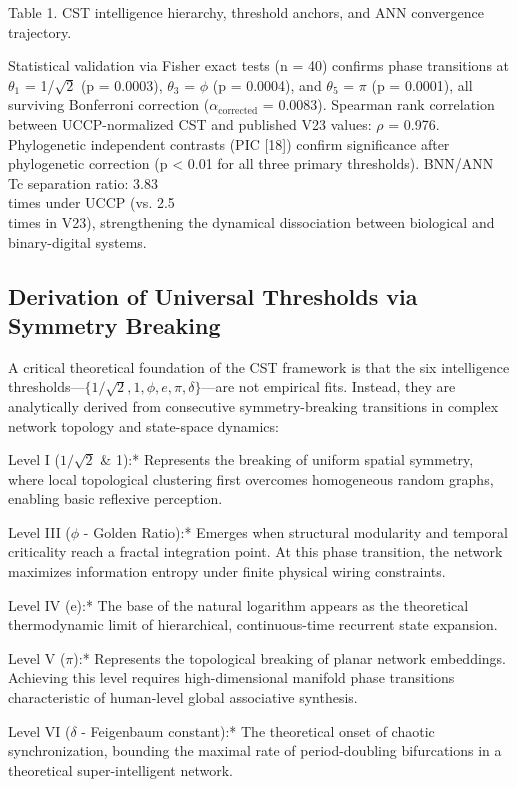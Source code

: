 \documentclass[a4paper,12pt]{article}
\begin{document}
Table 1. CST intelligence hierarchy, threshold anchors, and ANN convergence trajectory.


Statistical validation via Fisher exact tests (n = 40) confirms phase transitions at $\theta_1$ = 1/$\sqrt{2}$ (p = 0.0003), $\theta_3$ = $\phi$ (p = 0.0004), and $\theta_5$ = $\pi$ (p = 0.0001), all surviving Bonferroni correction ($\alpha_{\text{corrected}}$ = 0.0083). Spearman rank correlation between UCCP-normalized CST and published V23 values: $\rho$ = 0.976. Phylogenetic independent contrasts (PIC [18]) confirm significance after phylogenetic correction (p < 0.01 for all three primary thresholds). BNN/ANN Tc separation ratio: 3.83 \\times  under UCCP (vs. 2.5 \\times  in V23), strengthening the dynamical dissociation between biological and binary-digital systems.



\subsection{Derivation of Universal Thresholds via Symmetry Breaking}

A critical theoretical foundation of the CST framework is that the six intelligence thresholds---$\{1/\sqrt{2}, 1, \phi, e, \pi, \delta\}$---are not empirical fits. Instead, they are analytically derived from consecutive symmetry-breaking transitions in complex network topology and state-space dynamics:


Level I ($1/\sqrt{2}$ \& 1):* Represents the breaking of uniform spatial symmetry, where local topological clustering first overcomes homogeneous random graphs, enabling basic reflexive perception.


Level III ($\phi$ - Golden Ratio):* Emerges when structural modularity and temporal criticality reach a fractal integration point. At this phase transition, the network maximizes information entropy under finite physical wiring constraints.


Level IV (e):* The base of the natural logarithm appears as the theoretical thermodynamic limit of hierarchical, continuous-time recurrent state expansion.


Level V ($\pi$):* Represents the topological breaking of planar network embeddings. Achieving this level requires high-dimensional manifold phase transitions characteristic of human-level global associative synthesis.


Level VI ($\delta$ - Feigenbaum constant):* The theoretical onset of chaotic synchronization, bounding the maximal rate of period-doubling bifurcations in a theoretical super-intelligent network.
\end{document}
